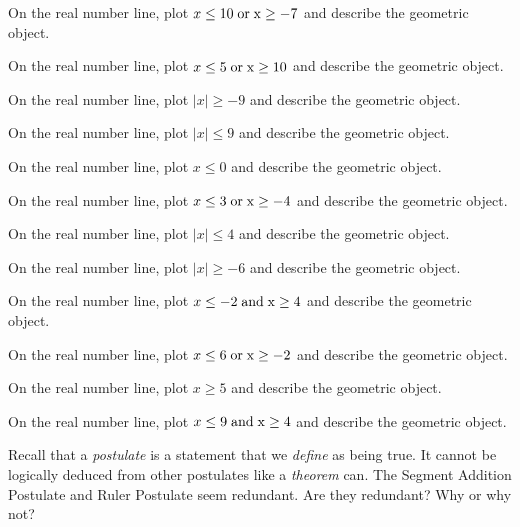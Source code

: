 \documentclass[12pt]{article}
\newenvironment{problem}[2][Problem]{\begin{trivlist}
			\item[\hskip \labelsep {\bfseries #1}\hskip \labelsep {\bfseries #2.}]}{\end{trivlist}}
\begin{document}
			\begin{problem}{0} 
On the real number line, plot $ x \leq 10 \;\rm{ or }\; x \geq -7$ and describe the geometric object.
 \end{problem}\begin{problem}{1} 
On the real number line, plot $ x \leq 5 \;\rm{ or }\; x \geq 10$ and describe the geometric object.
 \end{problem}\begin{problem}{2} 
On the real number line, plot $\mid x\mid \geq -9$ and describe the geometric object.
 \end{problem}\begin{problem}{3} 
On the real number line, plot $\mid x\mid \leq 9$ and describe the geometric object.
 \end{problem}\begin{problem}{4} 
On the real number line, plot $x \leq 0$ and describe the geometric object.
 \end{problem}\begin{problem}{5} 
On the real number line, plot $ x \leq 3 \;\rm{ or }\; x \geq -4$ and describe the geometric object.
 \end{problem}\begin{problem}{6} 
On the real number line, plot $\mid x\mid \leq 4$ and describe the geometric object.
 \end{problem}\begin{problem}{7} 
On the real number line, plot $\mid x\mid \geq -6$ and describe the geometric object.
 \end{problem}\begin{problem}{8} 
On the real number line, plot $ x \leq -2 \;\rm{ and }\; x \geq 4$ and describe the geometric object.
 \end{problem}\begin{problem}{9} 
On the real number line, plot $ x \leq 6 \;\rm{ or }\; x \geq -2$ and describe the geometric object.
 \end{problem}\begin{problem}{10} 
On the real number line, plot $x \geq 5$ and describe the geometric object.
 \end{problem}\begin{problem}{11} 
On the real number line, plot $ x \leq 9 \;\rm{ and }\; x \geq 4$ and describe the geometric object.
 \end{problem}\begin{problem}{Challenge} 

	Recall that a \textit{postulate} is a statement that we \textit{define} as being true. It cannot
	be logically deduced from other postulates like a \textit{theorem} can.
	The Segment Addition Postulate and Ruler Postulate seem redundant. Are they redundant? Why or why not?
	
 \end{problem}
\end{document}

